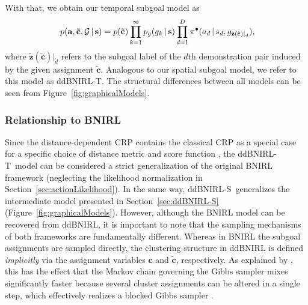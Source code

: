\documentclass[twoside,11pt]{article}
\newcommand{\p}{p}
\newcommand{\given}{\,\vert\,}
\newcommand{\softmax}{{\pi}}
\newcommand{\eqkomma}{,}
\newcommand{\ddBNIRLS}{\mbox{ddBNIRL-S}}
\newcommand{\ddBNIRLT}{\mbox{ddBNIRL-T}}
\begin{document}
With that, we obtain our temporal subgoal model as
\begin{equation}
\p(\mathbf{a},\mathbf{\tilde{c}},\mathcal{G} \given \mathbf{s}) = \p(\mathbf{\tilde{c}}) \prod_{k=1}^{\infty}\p_g(g_k \given \mathbf{s}) \prod_{d=1}^D \softmax^\bullet(a_d \given s_d, g_{\mathbf{\tilde{z}}(\mathbf{\tilde{c}})|_{d}}) \eqkomma \hspace{-0.5ex}
\label{eq:ddBNIRLTjoint}
\end{equation}
where $\mathbf{\tilde{z}}(\mathbf{\tilde{c}})|_{d}$ refers to the subgoal label of the $d$th demonstration pair induced by the given assignment $\mathbf{\tilde{c}}$. Analogous to our spatial subgoal model, we refer to this model as \ddBNIRLT. The structural differences between all models can be seen from Figure~\ref{fig:graphicalModels}.

\subsubsection{Relationship to BNIRL}
\label{sec:relationToBNIRL}
%
Since the distance-dependent CRP contains the classical CRP as a special case for a specific choice of distance metric and score function \citep{blei2011distance}, the \ddBNIRLT\  model can be considered a strict generalization of the original BNIRL framework %
%
(neglecting the likelihood normalization in Section~\ref{sec:actionLikelihood}). In the same way, \ddBNIRLS\ generalizes the intermediate model presented in Section~\ref{sec:ddBNIRL-S} (Figure~\ref{fig:graphicalModels}). However, although the BNIRL model can be recovered from ddBNIRL, it is important to note that the sampling mechanisms of both frameworks are fundamentally different. Whereas in BNIRL the subgoal assignments are sampled %
directly, the clustering structure in ddBNIRL is defined \textit{implicitly} via the assignment variables $\mathbf{c}$ and $\mathbf{\tilde{c}}$, respectively. As explained by \cite{blei2011distance}, this has the effect that the Markov chain governing the Gibbs sampler mixes significantly faster because %
several cluster assignments %
can be altered in a single step, %
which effectively realizes a blocked Gibbs %
sampler %
\citep{roberts1997updating}. %
\end{document}
